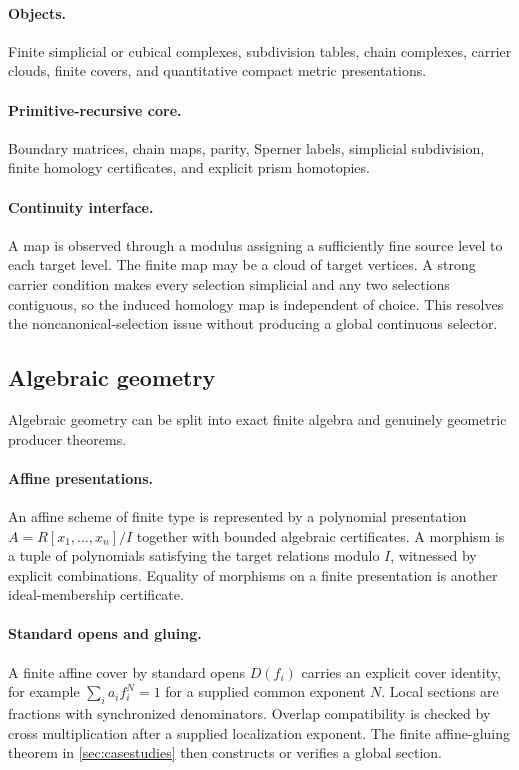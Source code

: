 \paragraph{Objects.}
Finite simplicial or cubical complexes, subdivision tables, chain complexes,
carrier clouds, finite covers, and quantitative compact metric presentations.

\paragraph{Primitive-recursive core.}
Boundary matrices, chain maps, parity, Sperner labels, simplicial subdivision,
finite homology certificates, and explicit prism homotopies.

\paragraph{Continuity interface.}
A map is observed through a modulus assigning a sufficiently fine source
level to each target level.  The finite map may be a cloud of target vertices.
A strong carrier condition makes every selection simplicial and any two
selections contiguous, so the induced homology map is independent of choice.
This resolves the noncanonical-selection issue without producing a global
continuous selector.

\subsection{Algebraic geometry}

Algebraic geometry can be split into exact finite algebra and genuinely
geometric producer theorems.

\paragraph{Affine presentations.}
An affine scheme of finite type is represented by a polynomial presentation
\(A=R[x_1,\ldots,x_n]/I\) together with bounded algebraic certificates.  A
morphism is a tuple of polynomials satisfying the target relations modulo
\(I\), witnessed by explicit combinations.  Equality of morphisms on a finite
presentation is another ideal-membership certificate.

\paragraph{Standard opens and gluing.}
A finite affine cover by standard opens \(D(f_i)\) carries an explicit cover
identity, for example \(\sum_i a_i f_i^N=1\) for a supplied common exponent
\(N\).  Local sections are fractions with synchronized
denominators.  Overlap compatibility is checked by cross multiplication after
a supplied localization exponent.  The finite affine-gluing theorem in
\cref{sec:casestudies} then constructs or verifies a global section.


